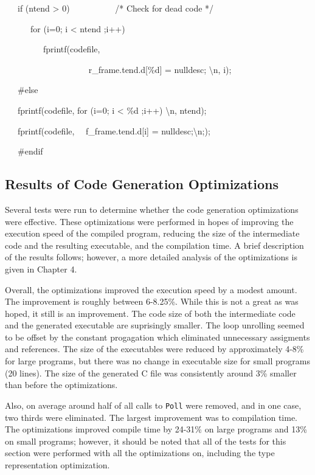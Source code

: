 {\ttfamily\mdseries
\ \ \ if (ntend {\textgreater} 0) \ \ \ \ \ \ \ \ \ \ /* Check for dead code */}

{\ttfamily\mdseries
\ \ \ \ \ \ for (i=0; i {\textless} ntend ;i++)}

{\ttfamily\mdseries
\ \ \ \ \ \ \ \ \ fprintf(codefile,}

{\ttfamily\mdseries
\ \ \ \ \ \ \ \ \ \ \ \ \ \ \ \ \ {\textquotedbl} \ \ r\_frame.tend.d[\%d] = nulldesc; {\textbackslash}n{\textquotedbl},
i);}

{\ttfamily\mdseries
\ \ \ \#else}

{\ttfamily\mdseries
\ \ \ fprintf(codefile, {\textquotedbl}for (i=0; i {\textless} \%d ;i++) {\textbackslash}n{\textquotedbl}, ntend);}

{\ttfamily\mdseries
\ \ \ fprintf(codefile, {\textquotedbl} \ \ f\_frame.tend.d[i] = nulldesc;{\textbackslash}n;{\textquotedbl});}

{\ttfamily\mdseries
\ \ \ \#endif}

\subsection{Results of Code Generation Optimizations}

Several tests were run to determine whether the code generation
optimizations were effective. These optimizations were performed in
hopes of improving the execution speed of the compiled program,
reducing the size of the intermediate code and the resulting
executable, and the compilation time. A brief description of the
results follows; however, a more detailed analysis of the
optimizations is given in Chapter 4.


Overall, the optimizations improved the execution speed by a modest
amount. The improvement is roughly between 6-8.25\%.  While this is
not a great as was hoped, it still is an improvement. The code size of
both the intermediate code and the generated executable are
suprisingly smaller. The loop unrolling seemed to be offset by the
constant progagation which eliminated unnecessary assigments and
references. The size of the executables were reduced by approximately
4-8\% for large programs, but there was no change in executable size
for small programs (20 lines). The size of the generated C file was
consistently around 3\% smaller than before the optimizations.


Also, on average around half of all calls to \texttt{Poll} were
removed, and in one case, two thirds were eliminated.  The largest
improvement was to compilation time. The optimizations improved
compile time by 24-31\% on large programs and 13\% on small programs;
however, it should be noted that all of the tests for this section
were performed with all the optimizations on, including the type
representation optimization.

